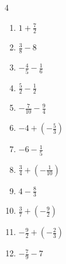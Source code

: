\begin{multicols}{4}
\begin{enumerate}

  \item $\displaystyle 1 + \frac{7}{2}$


  \item $\displaystyle \frac{3}{8} - 8$


  \item $\displaystyle -\frac{4}{5} - \frac{1}{6}$


  \item $\displaystyle \frac{5}{2} - \frac{1}{2}$

        \phantom{$\displaystyle =2$}

\columnbreak %

  \item $\displaystyle -\frac{7}{10} - \frac{9}{4}$


  \item $\displaystyle -4 + \left(-\frac{5}{3}\right)$


  \item $\displaystyle -6 - \frac{1}{5}$


  \item $\displaystyle \frac{3}{4} + \left(-\frac{1}{10}\right)$


  \item $\displaystyle 4 - \frac{8}{3}$


  \item $\displaystyle \frac{3}{7} + \left(-\frac{9}{2}\right)$


  \item $\displaystyle -\frac{9}{2} + \left(-\frac{2}{3}\right)$


  \item $\displaystyle -\frac{7}{9} - 7$


\end{enumerate}
\end{multicols}
